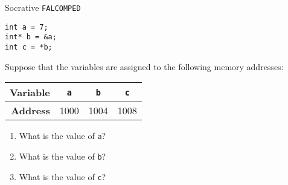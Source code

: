 \begin{frame}[fragile]{Socrative \texttt{FALCOMPED}}
    \begin{lstlisting}
int a = 7;
int* b = &a;
int c = *b;
    \end{lstlisting}
    Suppose that the variables are assigned to the following memory addresses:
    \begin{center}
        \begin{tabular}{r|ccc}
            \textbf{Variable} & {\lstinline!a!} & {\lstinline!b!} & {\lstinline!c!} \\ \hline
            \textbf{Address} & 1000 & 1004 & 1008
        \end{tabular}
    \end{center}
    \pause
    \begin{enumerate}
        \item What is the value of \lstinline{a}? \pause
        \item What is the value of \lstinline{b}? \pause
        \item What is the value of \lstinline{c}?
    \end{enumerate}
\end{frame}


